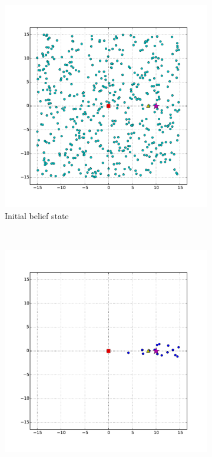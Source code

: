 
\begin{figure}
        \centering
        \begin{subfigure}[b]{0.3\textwidth}
                \includegraphics[width=\textwidth]{beam_bad_range_initial}
                \caption{Initial belief state}
                \label{fig:beam_bad_range_init}
        \end{subfigure}%
        ~ %
        \begin{subfigure}[b]{0.3\textwidth}
                \includegraphics[width=\textwidth]{beam_bad_range_first_obs}

\end{subfigure}
\end{figure}
